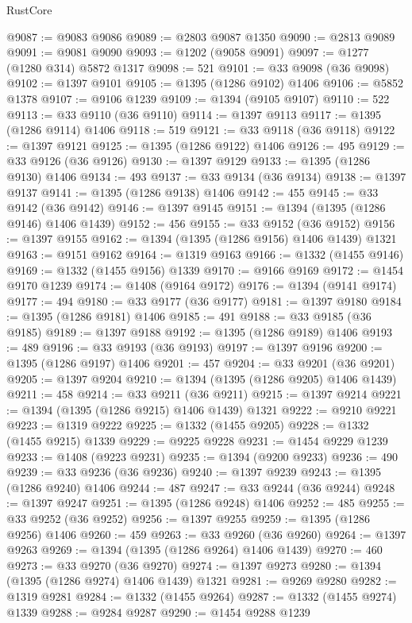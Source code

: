 \begin{lexlean}{RustCore}
\begin{coremodule}
@9087 := @9083 @9086
@9089 := @2803 @9087 @1350
@9090 := @2813 @9089
@9091 := @9081 @9090
@9093 := @1202 (@9058 @9091)
@9097 := @1277 (@1280 @314) @5872 @1317
@9098 := 521
@9101 := @33 @9098 (@36 @9098)
@9102 := @1397 @9101
@9105 := @1395 (@1286 @9102) @1406
@9106 := @5852 @1378
@9107 := @9106 @1239
@9109 := @1394 (@9105 @9107)
@9110 := 522
@9113 := @33 @9110 (@36 @9110)
@9114 := @1397 @9113
@9117 := @1395 (@1286 @9114) @1406
@9118 := 519
@9121 := @33 @9118 (@36 @9118)
@9122 := @1397 @9121
@9125 := @1395 (@1286 @9122) @1406
@9126 := 495
@9129 := @33 @9126 (@36 @9126)
@9130 := @1397 @9129
@9133 := @1395 (@1286 @9130) @1406
@9134 := 493
@9137 := @33 @9134 (@36 @9134)
@9138 := @1397 @9137
@9141 := @1395 (@1286 @9138) @1406
@9142 := 455
@9145 := @33 @9142 (@36 @9142)
@9146 := @1397 @9145
@9151 := @1394 (@1395 (@1286 @9146) @1406 @1439)
@9152 := 456
@9155 := @33 @9152 (@36 @9152)
@9156 := @1397 @9155
@9162 := @1394 (@1395 (@1286 @9156) @1406 @1439) @1321
@9163 := @9151 @9162
@9164 := @1319 @9163
@9166 := @1332 (@1455 @9146)
@9169 := @1332 (@1455 @9156) @1339
@9170 := @9166 @9169
@9172 := @1454 @9170 @1239
@9174 := @1408 (@9164 @9172)
@9176 := @1394 (@9141 @9174)
@9177 := 494
@9180 := @33 @9177 (@36 @9177)
@9181 := @1397 @9180
@9184 := @1395 (@1286 @9181) @1406
@9185 := 491
@9188 := @33 @9185 (@36 @9185)
@9189 := @1397 @9188
@9192 := @1395 (@1286 @9189) @1406
@9193 := 489
@9196 := @33 @9193 (@36 @9193)
@9197 := @1397 @9196
@9200 := @1395 (@1286 @9197) @1406
@9201 := 457
@9204 := @33 @9201 (@36 @9201)
@9205 := @1397 @9204
@9210 := @1394 (@1395 (@1286 @9205) @1406 @1439)
@9211 := 458
@9214 := @33 @9211 (@36 @9211)
@9215 := @1397 @9214
@9221 := @1394 (@1395 (@1286 @9215) @1406 @1439) @1321
@9222 := @9210 @9221
@9223 := @1319 @9222
@9225 := @1332 (@1455 @9205)
@9228 := @1332 (@1455 @9215) @1339
@9229 := @9225 @9228
@9231 := @1454 @9229 @1239
@9233 := @1408 (@9223 @9231)
@9235 := @1394 (@9200 @9233)
@9236 := 490
@9239 := @33 @9236 (@36 @9236)
@9240 := @1397 @9239
@9243 := @1395 (@1286 @9240) @1406
@9244 := 487
@9247 := @33 @9244 (@36 @9244)
@9248 := @1397 @9247
@9251 := @1395 (@1286 @9248) @1406
@9252 := 485
@9255 := @33 @9252 (@36 @9252)
@9256 := @1397 @9255
@9259 := @1395 (@1286 @9256) @1406
@9260 := 459
@9263 := @33 @9260 (@36 @9260)
@9264 := @1397 @9263
@9269 := @1394 (@1395 (@1286 @9264) @1406 @1439)
@9270 := 460
@9273 := @33 @9270 (@36 @9270)
@9274 := @1397 @9273
@9280 := @1394 (@1395 (@1286 @9274) @1406 @1439) @1321
@9281 := @9269 @9280
@9282 := @1319 @9281
@9284 := @1332 (@1455 @9264)
@9287 := @1332 (@1455 @9274) @1339
@9288 := @9284 @9287
@9290 := @1454 @9288 @1239

\end{coremodule}
\end{lexlean}

